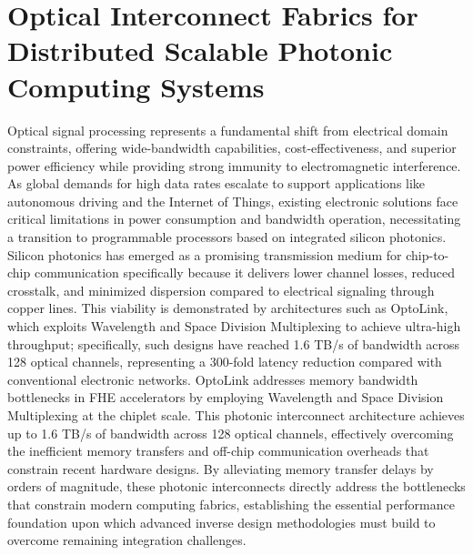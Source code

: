 \documentclass[11pt]{article}
\begin{document}
\section{Optical Interconnect Fabrics for Distributed Scalable Photonic Computing Systems}\label{optical-interconnect-fabrics-for-distributed-scalable-photonic-computing-systems}

Optical signal processing represents a fundamental shift from electrical domain constraints, offering wide-bandwidth capabilities, cost-effectiveness, and superior power efficiency while providing strong immunity to electromagnetic interference. As global demands for high data rates escalate to support applications like autonomous driving and the Internet of Things, existing electronic solutions face critical limitations in power consumption and bandwidth operation, necessitating a transition to programmable processors based on integrated silicon photonics. Silicon photonics has emerged as a promising transmission medium for chip-to-chip communication specifically because it delivers lower channel losses, reduced crosstalk, and minimized dispersion compared to electrical signaling through copper lines. This viability is demonstrated by architectures such as OptoLink, which exploits Wavelength and Space Division Multiplexing to achieve ultra-high throughput; specifically, such designs have reached 1.6 TB/s of bandwidth across 128 optical channels, representing a 300-fold latency reduction compared with conventional electronic networks. OptoLink addresses memory bandwidth bottlenecks in FHE accelerators by employing Wavelength and Space Division Multiplexing at the chiplet scale. This photonic interconnect architecture achieves up to 1.6 TB/s of bandwidth across 128 optical channels, effectively overcoming the inefficient memory transfers and off-chip communication overheads that constrain recent hardware designs. \citep{doi_10_1145_3806395_315ab915} By alleviating memory transfer delays by orders of magnitude, these photonic interconnects directly address the bottlenecks that constrain modern computing fabrics, establishing the essential performance foundation upon which advanced inverse design methodologies must build to overcome remaining integration challenges. \citep{doi_10_1109_access_2020_3013116_8fec1fb2} \citep{doi_10_1145_3806395_315ab915} \citep{doi_10_1007_s11082_024_08009_8_0f7f241e}
\end{document}
